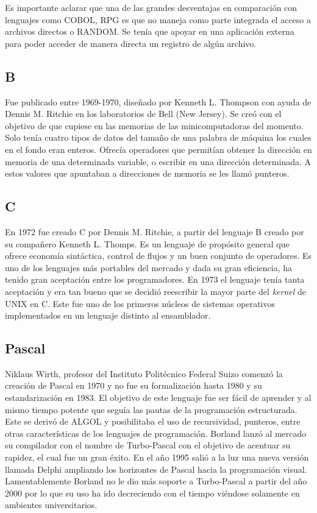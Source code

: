 \documentclass[twoside,twocolumn]{article}
\begin{document}
Es importante aclarar que una de las grandes desventajas en comparación con lenguajes como COBOL, RPG es que no maneja como parte integrada el acceso a archivos directos o RANDOM. Se tenía que apoyar en una aplicación externa para poder acceder de manera directa un registro de algún archivo.

\subsection{B}
Fue publicado entre 1969-1970, diseñado por Kenneth L. Thompson con ayuda de Dennis M. Ritchie en los laboratorios de Bell\cite{bell} (New Jersey). Se creó con el objetivo de que cupiese en las memorias de las minicomputadoras del momento. Solo tenía cuatro tipos de datos del tamaño de una palabra de máquina los cuales en el fondo eran enteros. Ofrecía operadores que permitían obtener la dirección en memoria de una determinada variable, o escribir en una dirección determinada. A estos valores que apuntaban a direcciones de memoria se les llamó punteros.

\subsection{C}
En 1972 fue creado C por Dennis M. Ritchie, a partir del lenguaje B creado por su compañero Kenneth L. Thomps. Es un lenguaje de propósito general que ofrece economía sintáctica, control de flujos y un buen conjunto de operadores. Es uno de los lenguajes más portables del mercado y dada su gran eficiencia, ha tenido gran aceptación entre los programadores. En 1973 el lenguaje tenía tanta aceptación y era tan bueno que se decidió reescribir la mayor parte del \textit{kernel} de UNIX en C. Este fue uno de los primeros núcleos de sistemas operativos implementados en un lenguaje distinto al ensamblador.

\subsection{Pascal}

Niklaus Wirth, profesor del Instituto Politécnico Federal Suizo comenzó la creación de Pascal en 1970 y no fue su formalización hasta 1980 y su estandarización en 1983. El objetivo de este lenguaje fue ser fácil de aprender y al mismo tiempo potente que seguía las pautas de la programación estructurada. Este se derivó de ALGOL y posibilitaba el uso de recursividad, punteros, entre otras características de los lenguajes de programación. Borland lanzó al mercado su compilador con el nombre de Turbo-Pascal con el objetivo de acentuar su rapidez, el cual fue un gran éxito. En el año 1995 salió a la luz una nueva versión llamada Delphi ampliando los horizontes de Pascal hacia la programación visual. Lamentablemente Borland no le dio más soporte a Turbo-Pascal a partir del año 2000 por lo que su uso ha ido decreciendo con el tiempo viéndose solamente en ambientes universitarios.
\end{document}
